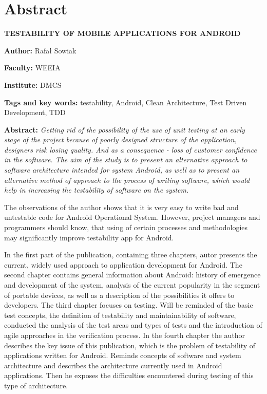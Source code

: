 \chapter{Abstract}
\label{abstract}

\textbf{TESTABILITY OF MOBILE APPLICATIONS FOR ANDROID}

\vspace{20pt}

\textbf{Author:} Rafał Sowiak

\textbf{Faculty:} WEEIA

\textbf{Institute:} DMCS

\textbf{Tags and key words:} testability, Android, Clean Architecture, Test Driven Development, TDD

\textbf{Abstract:} 
\textit{Getting rid of the possibility of the use of unit testing at an early stage of the project because of poorly designed structure of the application, designers risk losing quality. And as a consequence - loss of customer confidence in the software. The aim of the study is to present an alternative approach to software architecture intended for system Android, as well as to present an alternative method of approach to the process of writing software, which would help in increasing the testability of software on the system.}

The observations of the author shows that it is very easy to write bad and untestable code for Android Operational System. However, project managers and programmers should know, that using of certain processes and methodologies may significantly improve testability app for Android.

In the first part of the publication, containing three chapters, autor presents the current, widely used approach to application development for Android. The second chapter contains general information about Android: history of emergence and development of the system, analysis of the current popularity in the segment of portable devices, as well as a description of the possibilities it offers to developers. The third chapter focuses on testing. Will be reminded of the basic test concepts, the definition of testability and maintainability of software, conducted the analysis of the test areas and types of tests and the introduction of agile approaches in the verification process. In the fourth chapter the author describes the key issue of this publication, which is the problem of testability of applications written for Android. Reminds concepts of software and system architecture and describes the architecture currently used in Android applications. Then he exposes the difficulties encountered during testing of this type of architecture.


